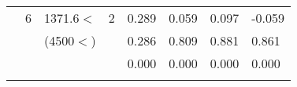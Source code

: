\begin{table}[p]
\begin{tabular}{cclcllll}
                                                               & 6                                                              & 1371.6$<$                                                             & 2                                                                     & 0.289                                       & 0.059                                            & 0.097                                              & -0.059  \\ 
                                                               &                                                                 & (4500$<$)                                                              &                                                                        &  0.286                                     & 0.809                                             & 0.881                                              & 0.861  \\ 
                                                               &                                                                 &                                                                                &                                                                        &  0.000                                      & 0.000                                            & 0.000                                              & 0.000  \\  
 \hline\noalign{\smallskip}
\end{tabular}
\label{app:Step-wise julian date}
\end{table}